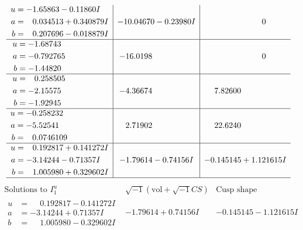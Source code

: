 \documentclass[1p]{elsarticle_modified}
\theoremstyle{definition}
\newcommand{\I}{\sqrt{-1}}
\begin{document}
$$\begin{array}{c|c|c}
\begin{aligned}
u &= -1.65863 - 0.11860 I \\
a &= \phantom{-}0.034513 + 0.340879 I \\
b &= \phantom{-}0.207696 - 0.018879 I\end{aligned}
 & -10.04670 - 0.23980 I & \phantom{-0.000000 } 0 \\ \hline\begin{aligned}
u &= -1.68743\phantom{ +0.000000I} \\
a &= -0.792765\phantom{ +0.000000I} \\
b &= -1.44820\phantom{ +0.000000I}\end{aligned}
 & -16.0198\phantom{ +0.000000I} & \phantom{-0.000000 } 0 \\ \hline\begin{aligned}
u &= \phantom{-}0.258505\phantom{ +0.000000I} \\
a &= -2.15575\phantom{ +0.000000I} \\
b &= -1.92945\phantom{ +0.000000I}\end{aligned}
 & -4.36674\phantom{ +0.000000I} & \phantom{-}7.82600\phantom{ +0.000000I} \\ \hline\begin{aligned}
u &= -0.258232\phantom{ +0.000000I} \\
a &= -5.52541\phantom{ +0.000000I} \\
b &= \phantom{-}0.0746109\phantom{ +0.000000I}\end{aligned}
 & \phantom{-}2.71902\phantom{ +0.000000I} & \phantom{-}22.6240\phantom{ +0.000000I} \\ \hline\begin{aligned}
u &= \phantom{-}0.192817 + 0.141272 I \\
a &= -3.14244 - 0.71357 I \\
b &= \phantom{-}1.005980 + 0.329602 I\end{aligned}
 & -1.79614 - 0.74156 I & -0.145145 + 1.121615 I\\
 \hline 
 \end{array}$$\newpage$$\begin{array}{c|c|c}  
\text{Solutions to }I^u_{1}& \I (\text{vol} + \sqrt{-1}CS) & \text{Cusp shape}\\
 \hline 
\begin{aligned}
u &= \phantom{-}0.192817 - 0.141272 I \\
a &= -3.14244 + 0.71357 I \\
b &= \phantom{-}1.005980 - 0.329602 I\end{aligned}
 & -1.79614 + 0.74156 I & -0.145145 - 1.121615 I \\ \hline\begin{aligned}

\end{aligned}
\end{array}$$
\end{document}
